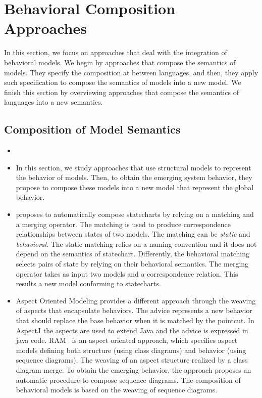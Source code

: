 \section{Behavioral Composition Approaches}

In this section, we focus on approaches that deal with the integration of behavioral models. We begin by approaches that compose the semantics of models. They specify the composition at between languages, and then, they apply such specification to compose the semantics of models into a new model. We finish this section by overviewing approaches that compose the semantics of languages into a new semantics.  
	
	\subsection{Composition of Model Semantics}
	\begin{itemize}
    \item {}
	\item In this section, we study approaches that use structural models to represent the behavior of models. Then, to obtain the emerging system behavior, they propose to compose these models into a new model that represent the global behavior.
		
	\item\cite{compostatechartsbib} proposes to automatically compose statecharts by relying on a matching and a merging operator. The matching is used to produce correspondence relationships between states of two models. The matching can be \emph{static} and \emph{behavioral}. The static matching relies on a naming convention and it does not depend on the semantics of statechart. Differently, the behavioral matching selects pairs of state by relying on their behavioral semantics. The merging operator takes as input two models and a correspondence relation. This results a new model conforming to statecharts.  
		 
	\item Aspect Oriented Modeling provides a different approach through the weaving of aspects that encapsulate behaviors\cite{weavingbib}. The advice represents a new behavior that should replace the base behavior when it is matched by the pointcut. In AspectJ\cite{AspectJoverview} the aspects are used to extend Java and the advice is expressed in java code. RAM~\cite{rambib,composdbib} is an aspect oriented approach, which specifies aspect models defining both structure (using class diagrams) and behavior (using sequence diagrams). The weaving of an aspect structure realized by a class diagram merge. To obtain the emerging behavior, the approach proposes an automatic procedure to compose sequence diagrams. The composition of behavioral models is based on the weaving of sequence diagrams.
	
\end{itemize}

